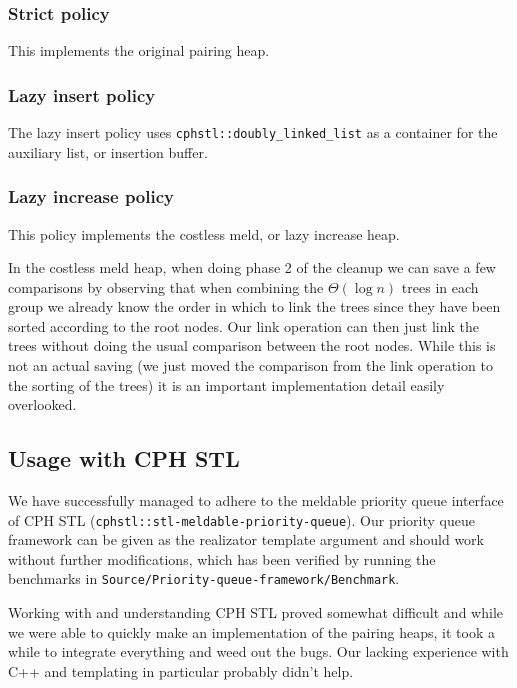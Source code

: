 \documentclass{DIKU-article}[2010/01/13]
\begin{document}
\subsubsection{Strict policy}

This implements the original pairing heap.

\subsubsection{Lazy insert policy}

The lazy insert policy uses \verb!cphstl::doubly_linked_list! as a container for
the auxiliary list, or insertion buffer.

\subsubsection{Lazy increase policy}

This policy implements the costless meld, or lazy increase heap.

In the costless meld heap, when doing phase 2 of the cleanup we can save a few
comparisons by observing that when combining the $\Theta(\log n)$ trees in each
group we already know the order in which to link the trees since they have been
sorted according to the root nodes. Our link operation can then just link the
trees without doing the usual comparison between the root nodes. While this is
not an actual saving (we just moved the comparison from the link operation to
the sorting of the trees) it is an important implementation detail easily
overlooked.

\subsection{Usage with CPH STL}

We have successfully managed to adhere to the meldable priority queue interface
of CPH STL (\verb!cphstl::stl-meldable-priority-queue!). Our priority queue
framework can be given as the realizator template argument and should work
without further modifications, which has been verified by running the benchmarks
in \verb!Source/Priority-queue-framework/Benchmark!.

Working with and understanding CPH STL proved somewhat difficult and while we
were able to quickly make an implementation of the pairing heaps, it took a
while to integrate everything and weed out the bugs. Our lacking experience with
C++ and templating in particular probably didn't help.
\end{document}
